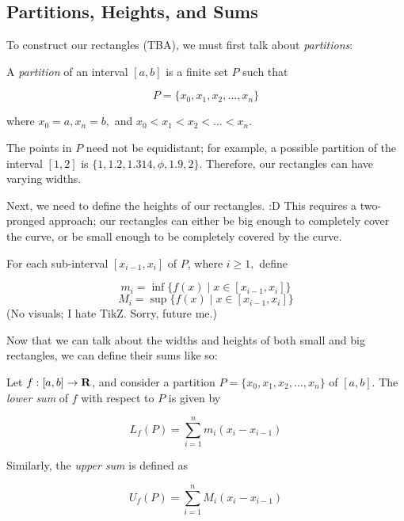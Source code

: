 \documentclass{article}
\begin{document}
      

  \subsection{Partitions, Heights, and Sums}
      To construct our rectangles (TBA), we must first talk about \emph{partitions}:

      \begin{defi}[Partitions]
        A \emph{partition} of an interval \([a,b]\) is a finite set \(P\) such that 

        \[
          P = \{x_0,x_1,x_2, \ldots, x_n\}
        \]
         
        \noindent
        where \(x_0 = a, x_n = b,\) and \(x_0 < x_1 < x_2 < \ldots < x_n.\)
      \end{defi}

      The points in \(P\) need not be equidistant; for example, a possible partition of the interval \([1,2]\) is \(\{1, 1.2, 1.314, \phi, 1.9, 2\}.\) Therefore, our rectangles can have varying widths.

      Next, we need to define the heights of our rectangles. :D This requires a two-pronged approach; our rectangles can either be big enough to completely cover the curve, or be small enough to be completely covered by the curve. 

      \begin{defi}
        For each sub-interval \([x_{i-1},x_i]\) of \(P\), where \(i \geq 1,\) define

        \[
          m_i = \inf\{f(x) \mid x \in [x_{i-1},x_i]\}
        \]
        \[
          M_i = \sup\{f(x) \mid x \in [x_{i-1},x_i]\}
        \]
        (No visuals; I hate TikZ. Sorry, future me.)
      \end{defi}

      Now that we can talk about the widths and heights of both small and big rectangles, we can define their sums like so:

      \begin{defi}
        Let \(f:[a,b] \to \mathbf{R}\), and consider a partition \(P = \{x_0,x_1,x_2, \ldots, x_n\}\) of \([a,b]\). The \emph{lower sum} of \(f\) with respect to \(P\) is given by

        \[
          L_f(P) = \sum_{i=1}^{n}{m_i(x_i-x_{i-1})}
        \]

        Similarly, the \emph{upper sum} is defined as 

        \[
          U_f(P) = \sum_{i=1}^{n}{M_i(x_i-x_{i-1})}
        \]
        
      \end{defi}
      
\end{document}
